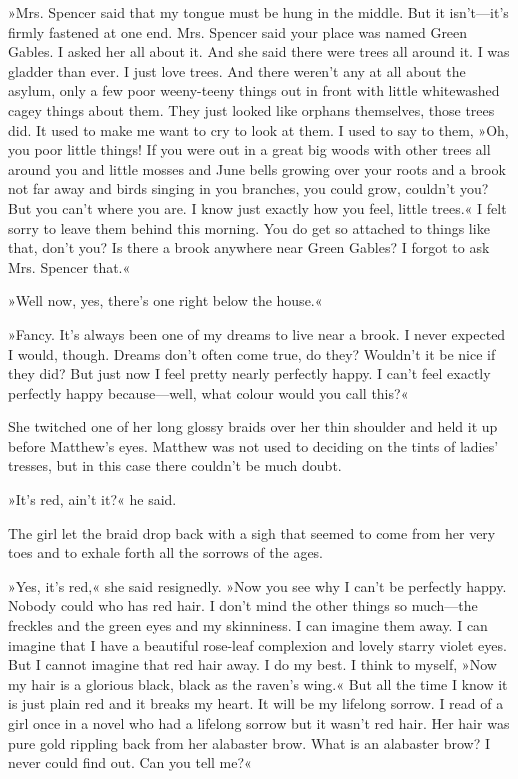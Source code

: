 »Mrs. Spencer said that my tongue must be hung in the middle. But it isn’t—it’s firmly fastened at one end. Mrs. Spencer said your place was named Green Gables. I asked her all about it. And she said there were trees all around it. I was gladder than ever. I just love trees. And there weren’t any at all about the asylum, only a few poor weeny-teeny things out in front with little whitewashed cagey things about them. They just looked like orphans themselves, those trees did. It used to make me want to cry to look at them. I used to say to them, »Oh, you poor little things! If you were out in a great big woods with other trees all around you and little mosses and June bells growing over your roots and a brook not far away and birds singing in you branches, you could grow, couldn't you? But you can’t where you are. I know just exactly how you feel, little trees.« I felt sorry to leave them behind this morning. You do get so attached to things like that, don’t you? Is there a brook anywhere near Green Gables? I forgot to ask Mrs. Spencer that.«

»Well now, yes, there’s one right below the house.«

»Fancy. It’s always been one of my dreams to live near a brook. I never expected I would, though. Dreams don’t often come true, do they? Wouldn’t it be nice if they did? But just now I feel pretty nearly perfectly happy. I can’t feel exactly perfectly happy because—well, what colour would you call this?«

She twitched one of her long glossy braids over her thin shoulder and held it up before Matthew’s eyes. Matthew was not used to deciding on the tints of ladies’ tresses, but in this case there couldn’t be much doubt.

»It’s red, ain’t it?« he said.

The girl let the braid drop back with a sigh that seemed to come from her very toes and to exhale forth all the sorrows of the ages.

»Yes, it’s red,« she said resignedly. »Now you see why I can’t be perfectly happy. Nobody could who has red hair. I don’t mind the other things so much—the freckles and the green eyes and my skinniness. I can imagine them away. I can imagine that I have a beautiful rose-leaf complexion and lovely starry violet eyes. But I cannot imagine that red hair away. I do my best. I think to myself, »Now my hair is a glorious black, black as the raven's wing.« But all the time I know it is just plain red and it breaks my heart. It will be my lifelong sorrow. I read of a girl once in a novel who had a lifelong sorrow but it wasn’t red hair. Her hair was pure gold rippling back from her alabaster brow. What is an alabaster brow? I never could find out. Can you tell me?«

